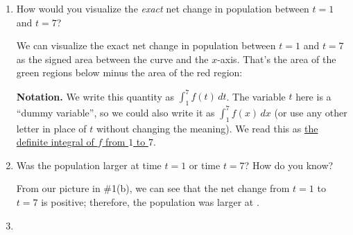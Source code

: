 \documentclass[main]{subfiles}
\begin{document}
\begin{enumerate}
{\begin{enumerate}
    \item
      \begin{problem}[24pt]
        How would you visualize the \emph{exact} net change in population
        between $t = 1$ and $t = 7$?
      \end{problem}

      \begin{solution}
        We can visualize the exact net change in population between $t =
        1$ and $t = 7$ as the signed area between the curve and the
        $x$-axis.  That's the area of the green regions below minus the
        area of the red region:
        \begin{center}
        \end{center}
      \end{solution}

      \begin{problemonly}
        \begin{framed}
          \textbf{Notation.} We write this quantity as $\displaystyle
          \int_1^7 f(t)\,dt$.  The variable $t$ here is a ``dummy
          variable'', so we could also write it as $\displaystyle \int_1^7
          f(x)\,dx$ (or use any other letter in place of $t$ without
          changing the meaning).  We read this as \uline{the definite
            integral of $f$ from $1$ to $7$}.
        \end{framed}
      \end{problemonly}

      

    \item
      \begin{problem}[\vfill]
        Was the population larger at time $t = 1$ or time $t = 7$?  How do
        you know?
      \end{problem}

      \begin{solution}
        From our picture in
        {{{{\#1}}(b)}},
        we can see that the net change from $t = 1$ to $t = 7$ is
        positive; therefore, the population was larger at .
      \end{solution}

    \item


\end{enumerate}}
\end{enumerate}
\end{document}
